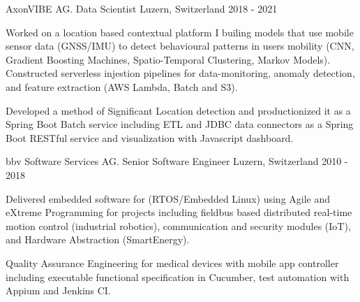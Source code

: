 

\begin{cventries}

  \cventry
    {AxonVIBE AG.} %
    {Data Scientist} %
    {Luzern, Switzerland} %
    {2018 - 2021} %
    {
      \begin{cvitems} %
        \item {
            Worked on a location based contextual platform I builing models that use
            mobile sensor data (GNSS/IMU) to detect behavioural patterns in users 
            mobility (CNN, Gradient Boosting Machines, Spatio-Temporal Clustering, Markov Models).
            Constructed serverless injestion pipelines for data-monitoring, anomaly detection, 
            and feature extraction (AWS Lambda, Batch and S3).}
        \item {
            Developed a method of Significant Location detection and productionized it
            as a Spring Boot Batch service including ETL and JDBC data connectors as a Spring Boot RESTful service and 
            visualization with Javascript dashboard.}
      \end{cvitems}
    }

\cventry
{bbv Software Services AG.} %
{Senior Software Engineer} %
{Luzern, Switzerland} %
{2010 - 2018} %
{
  \begin{cvitems} %
    \item {
        Delivered embedded software for (RTOS/Embedded Linux) using 
        Agile and eXtreme Programming for projects including fieldbus based distributed real-time 
        motion control (industrial robotics), communication and security modules (IoT),
        and Hardware Abstraction (SmartEnergy).}
    \item {
        Quality Assurance Engineering for medical devices with mobile app controller
        including executable functional specification in Cucumber, test automation with Appium
        and Jenkins CI. 
        }
  \end{cvitems}
}


\end{cventries}
